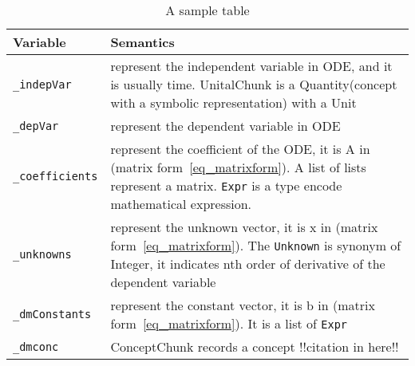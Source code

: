 \setlength\LTcapwidth{\linewidth}
\begin{table}
	\begin{tabular}{ p{} p{} }
		\textbf{Variable} & \textbf{Semantics} \\
		\toprule
		\verb|_indepVar| & represent the independent variable in ODE, and it is usually time. UnitalChunk is a Quantity(concept with a symbolic representation) with a Unit\\
		\verb|_depVar| & represent the dependent variable in ODE \\
		\verb|_coefficients| & represent the coefficient of the ODE, it is A in (matrix form~\ref{eq_matrixform}). A list of lists represent a matrix. \verb|Expr| is a type encode mathematical expression. \\
		\verb|_unknowns| & represent the unknown vector, it is x in (matrix form~\ref{eq_matrixform}). The \verb|Unknown| is synonym of Integer, it indicates nth order of derivative of the dependent variable \\
		\verb|_dmConstants| & represent the constant vector, it is b in (matrix form~\ref{eq_matrixform}). It is a list of \verb|Expr| \\
		\verb|_dmconc| &  ConceptChunk records a concept !!citation in here!! \\

		\bottomrule	
	\end{tabular}	
	\caption{A sample table}	
	\label{tab_sample}
\end{table}

